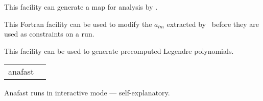 \begin{support}
  \begin{sulist}{} %
  \item[\htmlref{synfast}{fac:synfast}] This \healpix facility can generate a map for analysis by \thedocid.
  \item[\htmlref{alteralm}{fac:alteralm}] This \healpix Fortran facility can be
  used to modify the $a_{lm}$ extracted by \thedocid\ before they are used as
  constraints on a  run.
  \item[\htmlref{plmgen}{fac:plmgen}] This \healpix facility can be used to generate precomputed Legendre polynomials.
		
  \end{sulist}
\end{support}

\begin{examples}{1}
{
\begin{tabular}{ll} %
anafast  \\
\end{tabular}
}
{
Anafast runs in interactive mode --- self-explanatory.
}
\end{examples}

\vfill\newpage

